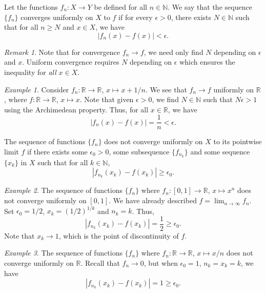 \documentclass[11pt]{article}
\def\R{\mathbb{R}}
\def\N{\mathbb{N}}
\theoremstyle{definition}
\theoremstyle{remark}
\newtheorem*{remark}{Remark}
\newtheorem*{example}{Example}
\numberwithin{equation}{module}
\begin{document}
    \begin{definition}
        Let the functions $f_n\colon X \to Y$ be defined for all $n \in \N$.
        We say that the sequence $\{f_n\}$ converges uniformly on $X$ to $f$ if
        for every $\epsilon > 0$, there exists $N \in \N$ such that for all $n \geq
        N$ and $x \in X$, we have \[
            |f_n(x) - f(x)| < \epsilon.
        \] 
        \begin{remark}
            Note that for convergence $f_n \to f$, we need only find $N$
            depending on $\epsilon$ and $x$. Uniform convergence requires $N$
            depending on $\epsilon$ which ensures the inequality for \emph{all} 
            $x \in X$.
        \end{remark}
    \end{definition}
    \begin{example}
        Consider $f_n\colon \R \to \R$, $x \mapsto x + 1 /n$. We see that $f_n \to
        f$ uniformly on $\R$, where $f\colon \R \to \R$, $x \mapsto x$.
        Note that given $\epsilon > 0$, we find $N \in \N$ such that $N\epsilon >
        1$ using the Archimedean property. Thus, for all $x \in \R$, we have \[
            |f_n(x) - f(x)| = \frac{1}{n} < \epsilon.
        \] 
    \end{example}

    \begin{lemma}
        The sequence of functions $\{f_n\}$ does not converge uniformly on $X$ to
        its pointwise limit $f$ if there exists some $\epsilon_0 > 0$, some
        subsequence $\{f_{n_k}\}$ and some sequence $\{x_k\}$ in $X$ such that for
        all $k \in \N$, \[
            |f_{n_k}(x_k) - f(x_k)| \geq \epsilon_0.
        \] 
    \end{lemma}
    \begin{example}
        The sequence of functions $\{f_n\}$ where $f_n\colon [0, 1] \to \R$, $x
        \mapsto x^n$ does not converge uniformly on $[0, 1]$.
        We have already described $f = \lim_{n \to \infty} f_n$.
        Set $\epsilon_0 = 1 /2$, $x_k = (1 /2)^{1 /k}$ and $n_k = k$. Thus, \[
            |f_{n_k}(x_k) - f(x_k)| = \frac{1}{2} \geq \epsilon_0.
        \]
        Note that $x_k \to 1$, which is the point of discontinuity of $f$.
    \end{example}
    \begin{example}
        The sequence of functions $\{f_n\}$ where $f_n\colon \R \to \R$, $x \mapsto
        x /n$ does not converge uniformly on $\R$.
        Recall that $f_n \to 0$, but when $\epsilon_0 = 1$, $n_k = x_k = k$, we have
        \[
            |f_{n_k}(x_k) - f(x_k)| = 1 \geq \epsilon_0.
        \] 
    \end{example}
\end{document}
